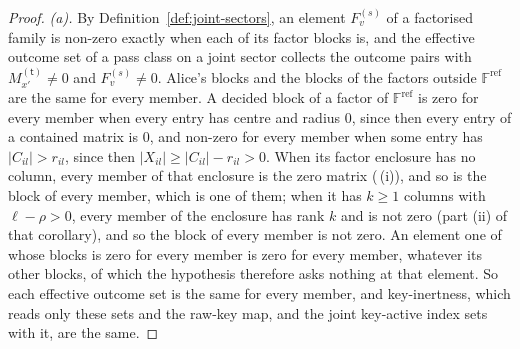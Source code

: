 \begin{proof}
\emph{(a).} By Definition~\ref{def:joint-sectors}, an element
$F^{(s)}_v$ of a factorised family is non-zero exactly when each of its
factor blocks is, and the effective outcome set of a pass class on a joint
sector collects the outcome pairs with $M^{(\mathsf t)}_{x'}\ne0$ and
$F^{(s)}_v\ne0$. Alice's blocks and the blocks of the factors outside
$\mathbb{F}^{\mathrm{ref}}$ are the same for every member. A decided block of
a factor of $\mathbb{F}^{\mathrm{ref}}$ is zero for every member when every
entry has centre and radius $0$, since then every entry of a contained matrix
is $0$, and non-zero for every member when some entry has
$|C_{il}|>r_{il}$, since then $|X_{il}|\ge|C_{il}|-r_{il}>0$. When its
factor enclosure has no column, every member of that enclosure is the zero
matrix (\,(i)), and so is
the block of every member, which is one of them; when it has $k\ge1$ columns
with $\ell-\rho>0$, every member of the enclosure has rank $k$ and is not
zero (part (ii) of that corollary), and so the block of every member is not
zero. An element one of whose blocks is zero for every member is zero for
every member, whatever its other blocks, of which the hypothesis therefore
asks nothing at that element. So each effective outcome set is the same for every member, and
key-inertness, which reads only these sets and the raw-key map, and the joint
key-active index sets with it, are the same.


\end{proof}
